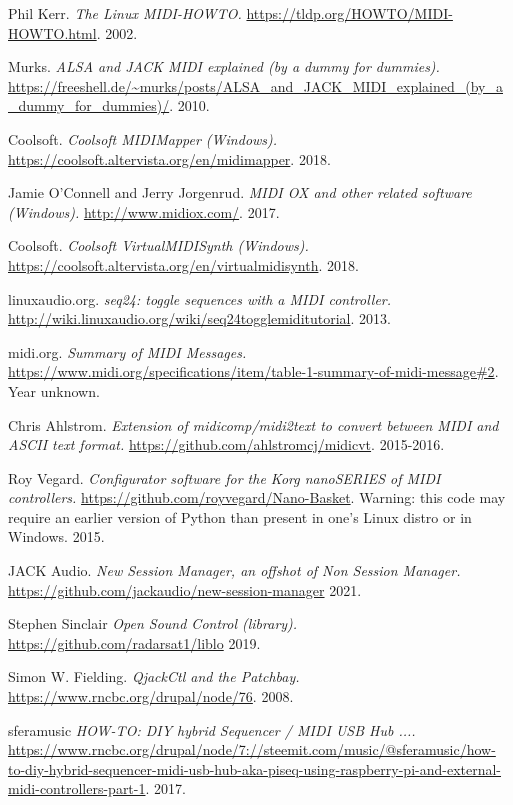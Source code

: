 {\begin{thebibliography}{99}
   Phil Kerr.
   \emph{The Linux MIDI-HOWTO.}
   \url{https://tldp.org/HOWTO/MIDI-HOWTO.html}.
   2002.

   Murks.
   \emph{ALSA and JACK MIDI explained (by a dummy for dummies).}
   \url{https://freeshell.de/~murks/posts/ALSA_and_JACK_MIDI_explained_(by_a_dummy_for_dummies)/}.
   2010.

   Coolsoft.
   \emph{Coolsoft MIDIMapper (Windows).}
   \url{https://coolsoft.altervista.org/en/midimapper}.
   2018.

   Jamie O'Connell and Jerry Jorgenrud.
   \emph{MIDI OX and other related software (Windows).}
   \url{http://www.midiox.com/}.
   2017.

   Coolsoft.
   \emph{Coolsoft VirtualMIDISynth (Windows).}
   \url{https://coolsoft.altervista.org/en/virtualmidisynth}.
   2018.

   linuxaudio.org.
   \emph{seq24: toggle sequences with a MIDI controller.}
   \url{http://wiki.linuxaudio.org/wiki/seq24togglemiditutorial}.
   2013.

   midi.org.
   \emph{Summary of MIDI Messages.}
   \url{https://www.midi.org/specifications/item/table-1-summary-of-midi-message#2}.
   Year unknown.

   Chris Ahlstrom.
   \emph{Extension of midicomp/midi2text to convert between MIDI and ASCII
      text format.}
   \url{https://github.com/ahlstromcj/midicvt}.
   2015-2016.

   Roy Vegard.
   \emph{Configurator software for the Korg nanoSERIES of MIDI controllers.}
   \url{https://github.com/royvegard/Nano-Basket}.
   Warning: this code may require an earlier version of Python than present in
   one's Linux distro or in Windows.
   2015.

   JACK Audio.
   \emph{New Session Manager, an offshot of Non Session Manager.}
   \url{https://github.com/jackaudio/new-session-manager}
   2021.

   Stephen Sinclair
   \emph{Open Sound Control (library).}
   \url{https://github.com/radarsat1/liblo}
   2019.

   Simon W. Fielding.
   \emph{QjackCtl and the Patchbay.}
   \url{https://www.rncbc.org/drupal/node/76}.
   2008.

   sferamusic
   \emph{HOW-TO: DIY hybrid Sequencer / MIDI USB Hub ....}
   \url{https://www.rncbc.org/drupal/node/7://steemit.com/music/@sferamusic/how-to-diy-hybrid-sequencer-midi-usb-hub-aka-piseq-using-raspberry-pi-and-external-midi-controllers-part-1}.
   2017.


\end{thebibliography}}
